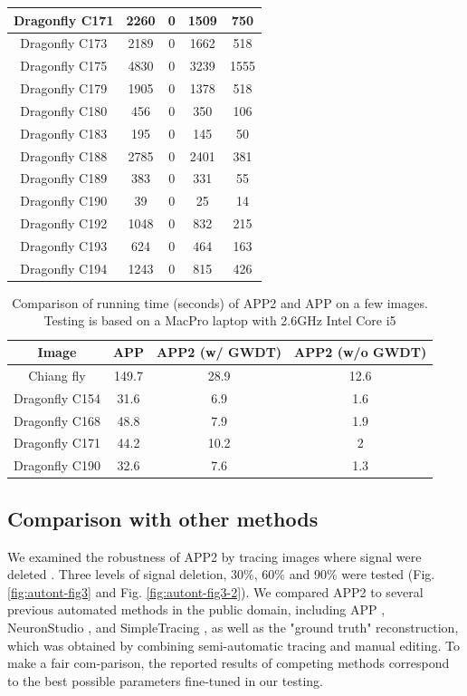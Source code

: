 \begin{table}
\begin{center}
\begin{tabular}{ccccc}
Dragonfly C171 &	2260 &	0 &	1509 &	750\\ \hline
Dragonfly C173 &	2189 &	0 &	1662 &	518\\ \hline
Dragonfly C175 &	4830 &	0 &	3239 &	1555\\ \hline
Dragonfly C179 &	1905 &	0 &	1378 &	518\\ \hline
Dragonfly C180 &	456	& 0	& 350 &	106\\ \hline
Dragonfly C183 &	195	& 0	& 145 &	50\\ \hline
Dragonfly C188 &	2785 &	0 &	2401 &	381\\ \hline
Dragonfly C189 &	383	& 0	& 331 &	55\\ \hline
Dragonfly C190 &	39	& 0	& 25 &	14\\ \hline
Dragonfly C192 &	1048 &	0 &	832 &	215\\ \hline
Dragonfly C193 &	624	& 0	& 464 &	163\\ \hline
Dragonfly C194 &	1243 &	0 &	815 &	426\\ \hline
    \end{tabular}
\end{center}
\end{table}

\begin{table} \label{tab:autont-tab2}
\caption{Comparison of running time (seconds) of APP2 and APP on a few images. Testing is based on a MacPro laptop with 2.6GHz Intel Core i5}
\begin{center}
\begin{tabular}{cccc}
\hline
Image	& APP &	APP2 (w/ GWDT)	& APP2 (w/o GWDT) \\ \hline
Chiang fly & 149.7 &	28.9 &	12.6 \\ \hline
Dragonfly C154 &	31.6 &	6.9 &	1.6 \\ \hline
Dragonfly C168 &	48.8 &	7.9	& 1.9 \\ \hline
Dragonfly C171 &	44.2 &	10.2 &	2 \\ \hline
Dragonfly C190 &	32.6 &	7.6	& 1.3 \\ \hline
\end{tabular}
\end{center}
\end{table}

\subsection{Comparison with other methods}
We examined the robustness of APP2 by tracing images where signal were deleted \cite{peng2010automatic}. Three levels of signal deletion, 30\%, 60\% and 90\% were tested (Fig. \ref{fig:autont-fig3} and Fig. \ref{fig:autont-fig3-2}). We compared APP2 to several previous automated methods in the public domain, including APP \cite{peng2011automatic}, NeuronStudio \cite{rodriguez2008automated}, and SimpleTracing \cite{yang2013distance} , as well as the "ground truth" reconstruction, which was obtained by combining semi-automatic tracing and manual editing. To make a fair com-parison, the reported results of competing methods correspond to the best possible parameters fine-tuned in our testing. 

